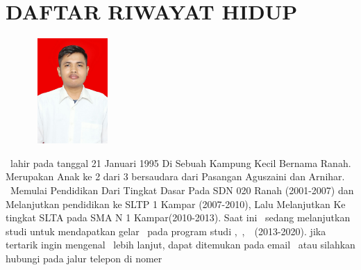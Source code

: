%
%
%
%

\chapter*{DAFTAR RIWAYAT HIDUP}
\pagestyle{empty}

\noindent

\begin{figure}
\includegraphics[width=3cm, height=4cm]{konten/gambar/fotoprofil.jpg}
\end{figure}


\penulisdua \ lahir pada tanggal 21 Januari 1995 Di Sebuah Kampung Kecil Bernama Ranah. Merupakan Anak ke 2 dari 3 bersaudara dari Pasangan Aguszaini dan Arnihar.
\inisial \ Memulai Pendidikan Dari Tingkat Dasar Pada SDN 020 Ranah (2001-2007) dan Melanjutkan pendidikan ke SLTP 1 Kampar (2007-2010), Lalu Melanjutkan Ke tingkat SLTA pada SMA N 1 Kampar(2010-2013). Saat ini \inisial \ sedang melanjutkan studi untuk mendapatkan gelar \gelar \ pada program studi \programStudi ,\ \fakultas ,\ \universitas \ (2013-2020).
jika tertarik ingin mengenal \inisial \ lebih lanjut, \inisial dapat ditemukan pada email \email \  atau silahkan hubungi pada jalur telepon di nomer \nohp